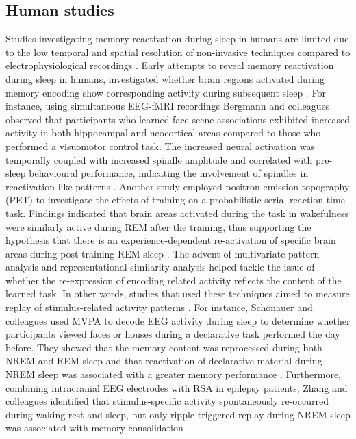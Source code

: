 \subsection{Human studies}
Studies investigating memory reactivation during sleep in humans are limited due to the low temporal and spatial resolution of non-invasive techniques compared to electrophysiological recordings \parencite{schreiner_electrophysiological_2020}. 
Early attempts to reveal memory reactivation during sleep in humans, investigated whether brain regions activated during memory encoding show corresponding activity during subsequent sleep \parencite{bergmann_sleep_2012,maquet_experience-dependent_2000,peigneux_are_2004,yotsumoto_location-specific_2009}. For instance, using simultaneous EEG-fMRI recordings Bergmann and colleagues observed that participants who learned face-scene associations exhibited increased activity in both hippocampal and neocortical areas compared to those who performed a visuomotor control task. The increased neural activation was temporally coupled with increased spindle amplitude and correlated with pre-sleep behavioural performance, indicating the involvement of spindles in reactivation-like patterns \parencite{bergmann_sleep_2012}. Another study employed positron emission topography (PET) to investigate the effects of training on a probabilistic serial reaction time task. Findings indicated that brain areas activated during the task in wakefulness were similarly active during REM after the training, thus supporting the hypothesis that there is an experience-dependent re-activation of specific brain areas during post-training REM sleep \parencite{maquet_experience-dependent_2000}.
The advent of multivariate pattern analysis \parencite[MVPA;][]{haxby_distributed_2001} and representational similarity analysis \parencite[RSA;][]{schonauer_decoding_2017} helped tackle the issue of whether the re-expression of encoding related activity reflects the content of the learned task. In other words, studies that used these techniques aimed to measure replay of stimulus-related activity patterns \parencite{deuker_memory_2013,liu_human_2019,schonauer_decoding_2017,sterpenich_memory_2014,zhang_electrophysiological_2018}. For instance, Schönauer and colleagues used MVPA to decode EEG activity during sleep to determine whether participants viewed faces or houses during a declarative task performed the day before. They showed that the memory content was reprocessed during both NREM and REM sleep and that reactivation of declarative material during NREM sleep was associated with a greater memory performance \parencite{schonauer_decoding_2017}. Furthermore, combining intracranial EEG electrodes with RSA in epilepsy patients, Zhang and colleagues identified that stimulus-specific activity spontaneously re-occurred during waking rest and sleep, but only ripple-triggered replay during NREM sleep was associated with memory consolidation \parencite{zhang_electrophysiological_2018}.\\
